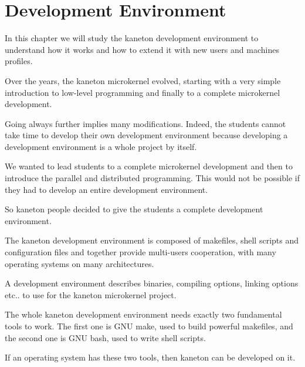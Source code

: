 
%
%

\chapter{Development Environment}

In this chapter we will study the kaneton development environment
to understand how it works and how to extend it with new users and
machines profiles.

\newpage

%
%

Over the years, the kaneton microkernel evolved, starting with a
very simple introduction to low-level programming and finally
to a complete microkernel development.

Going always further implies many modifications. Indeed, the students
cannot take time to develop their own development environment because
developing a development environment is a whole project by itself.

We wanted to lead students to a complete microkernel development and then
to introduce the parallel and distributed programming. This would not
be possible if they had to develop an entire development environment.

So kaneton people decided to give the students a complete development
environment.

The kaneton development environment is composed of makefiles, shell
scripts and configuration files and together provide multi-users cooperation,
with many operating systems on many architectures.

A development environment describes binaries, compiling options, linking
options etc.. to use for the kaneton microkernel project.

The whole kaneton development environment needs exactly two
fundamental tools to work. The first one is GNU make, used to build
powerful makefiles, and the second one is GNU bash, used to write
shell scripts.

If an operating system has these two tools, then kaneton can be developed
on it.

%
%

